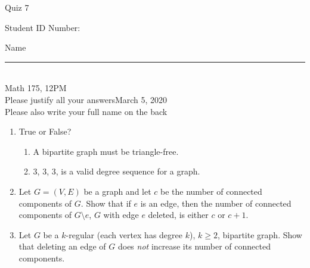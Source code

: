\documentclass[12pt]{article}
\begin{document}
\begin{flushleft} 
\centerline{\LARGE{Quiz 7}} 
\vspace{5 mm}
{Student ID Number:}\hfill  
{Name \rule {2 in}{0.01in}}\\
Math 175, 12PM
\\
{Please justify all your answers}\hfill {March 5, 2020}
\\
{Please also write your full name on the back} 

\medskip
\end{flushleft}

\begin{enumerate}
	\item True or False?
	\begin{enumerate}
		\item A bipartite graph must be triangle-free.
		\item 3, 3, 3, is a valid degree sequence for a graph.
	\end{enumerate}
	\item Let $G = (V, E)$ be a graph and let $c$ be the number of connected components of $G$. Show that if $e$ is an edge, then the number of connected components of $G\setminus e$, $G$ with edge $e$ deleted, is either $c$ or $c+1$.
	\vfill
	\item Let $G$ be a $k$-regular (each vertex has degree $k$), $k\geq 2$, bipartite graph. Show that deleting an edge of $G$ does \textit{not} increase its number of connected components.
	\vfill
\end{enumerate}

\end{document}
